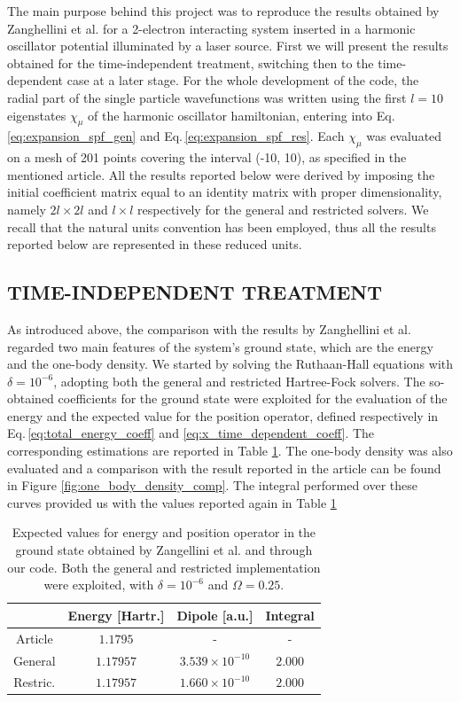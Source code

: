 The main purpose behind this project was to reproduce the results obtained by Zanghellini et al. for a 2-electron interacting system inserted in a harmonic oscillator potential illuminated by a laser source. First we will present the results obtained for the time-independent treatment, switching then to the time-dependent case at a later stage. For the whole development of the code, the radial part of the single particle wavefunctions was written using the first $l=10$ eigenstates $\chi_\mu$ of the harmonic oscillator hamiltonian, entering into Eq.\,\ref{eq:expansion_spf_gen} and Eq.\,\ref{eq:expansion_spf_res}. Each $\chi_\mu$ was evaluated on a mesh of 201 points covering the interval (-10, 10), as specified in the mentioned article. All the results reported below were derived by imposing the initial coefficient matrix equal to an identity matrix with proper dimensionality, namely $2l\times 2l$ and $l\times l$ respectively for the general and restricted solvers. We recall that the natural units convention has been employed, thus all the results reported below are represented in these reduced units.


\subsection{TIME-INDEPENDENT TREATMENT}
As introduced above, the comparison with the results by Zanghellini et al. regarded two main features of the system's ground state, which are the energy and the one-body density. We started by solving the Ruthaan-Hall equations with $\delta=10^{-6}$, adopting both the general and restricted Hartree-Fock solvers. The so-obtained coefficients for the ground state were exploited for the evaluation of the energy and the expected value for the position operator, defined respectively in Eq.\,\ref{eq:total_energy_coeff} and \ref{eq:x_time_dependent_coeff}. The corresponding estimations are reported in Table \ref{tab:E_x_comp_article}. The one-body density was also evaluated and a comparison with the result reported in the article can be found in Figure \ref{fig:one_body_density_comp}. The integral performed over these curves provided us with the values reported again in Table \ref{tab:E_x_comp_article} 

\begin{table}[h!]
    \centering
    \begin{tabular}{cccc}
        \toprule
         & Energy [Hartr.] & Dipole [a.u.] & Integral  \\
        \midrule
        Article & $1.1795$ & - & - \\
        General & $1.17957$ &  $3.539\times10^{-10}$ & $2.000$ \\
        Restric. & $1.17957$ & $1.660\times10^{-10}$ & $2.000$ \\
        \bottomrule
    \end{tabular}
    \caption{Expected values for energy and position operator in the ground state obtained by Zangellini et al. and through our code. Both the general and restricted implementation were exploited, with $\delta=10^{-6}$ and $\Omega=0.25$. }
    \label{tab:E_x_comp_article}
\end{table}



